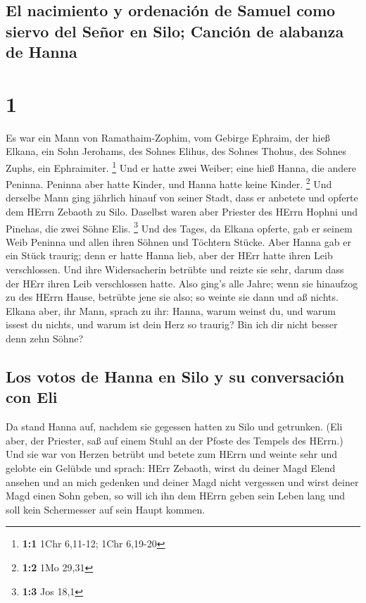 \hypertarget{el-nacimiento-y-ordenaciuxf3n-de-samuel-como-siervo-del-seuxf1or-en-silo-canciuxf3n-de-alabanza-de-hanna}{%
\subsection{El nacimiento y ordenación de Samuel como siervo del Señor
en Silo; Canción de alabanza de
Hanna}\label{el-nacimiento-y-ordenaciuxf3n-de-samuel-como-siervo-del-seuxf1or-en-silo-canciuxf3n-de-alabanza-de-hanna}}

\hypertarget{section}{%
\section{1}\label{section}}

 Es war ein Mann von Ramathaim-Zophim, vom Gebirge
Ephraim, der hieß Elkana, ein Sohn Jerohams, des Sohnes Elihus, des
Sohnes Thohus, des Sohnes Zuphs, ein Ephraimiter. \footnote{\textbf{1:1}
  1Chr 6,11-12; 1Chr 6,19-20}  Und er hatte zwei Weiber;
eine hieß Hanna, die andere Peninna. Peninna aber hatte Kinder, und
Hanna hatte keine Kinder. \footnote{\textbf{1:2} 1Mo 29,31}
 Und derselbe Mann ging jährlich hinauf von seiner Stadt,
dass er anbetete und opferte dem HErrn Zebaoth zu Silo. Daselbst waren
aber Priester des HErrn Hophni und Pinehas, die zwei Söhne Elis.
\footnote{\textbf{1:3} Jos 18,1}  Und des Tages, da Elkana
opferte, gab er seinem Weib Peninna und allen ihren Söhnen und Töchtern
Stücke.  Aber Hanna gab er ein Stück traurig; denn er
hatte Hanna lieb, aber der HErr hatte ihren Leib verschlossen.
 Und ihre Widersacherin betrübte und reizte sie sehr,
darum dass der HErr ihren Leib verschlossen hatte.  Also
ging's alle Jahre; wenn sie hinaufzog zu des HErrn Hause, betrübte jene
sie also; so weinte sie dann und aß nichts.  Elkana aber,
ihr Mann, sprach zu ihr: Hanna, warum weinst du, und warum issest du
nichts, und warum ist dein Herz so traurig? Bin ich dir nicht besser
denn zehn Söhne?

\hypertarget{los-votos-de-hanna-en-silo-y-su-conversaciuxf3n-con-eli}{%
\subsection{Los votos de Hanna en Silo y su conversación con
Eli}\label{los-votos-de-hanna-en-silo-y-su-conversaciuxf3n-con-eli}}

 Da stand Hanna auf, nachdem sie gegessen hatten zu Silo
und getrunken. (Eli aber, der Priester, saß auf einem Stuhl an der
Pfoste des Tempels des HErrn.)  Und sie war von Herzen
betrübt und betete zum HErrn und weinte sehr  und gelobte
ein Gelübde und sprach: HErr Zebaoth, wirst du deiner Magd Elend ansehen
und an mich gedenken und deiner Magd nicht vergessen und wirst deiner
Magd einen Sohn geben, so will ich ihn dem HErrn geben sein Leben lang
und soll kein Schermesser auf sein Haupt kommen.


